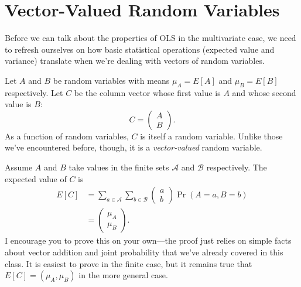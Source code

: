 \documentclass[12pt,oneside,openany]{book}
\begin{document}
\section{Vector-Valued Random
Variables}\label{vector-valued-random-variables}

Before we can talk about the properties of OLS in the multivariate case,
we need to refresh ourselves on how basic statistical operations
(expected value and variance) translate when we're dealing with vectors
of random variables.

Let \(A\) and \(B\) be random variables with means \(\mu_A = E[A]\) and
\(\mu_B = E[B]\) respectively. Let \(C\) be the column vector whose
first value is \(A\) and whose second value is \(B\): \[
C = \begin{pmatrix} A \\ B \end{pmatrix}.
\] As a function of random variables, \(C\) is itself a random variable.
Unlike those we've encountered before, though, it is a
\emph{vector-valued} random variable.

Assume \(A\) and \(B\) take values in the finite sets \(\mathcal{A}\)
and \(\mathcal{B}\) respectively. The expected value of \(C\) is \[
\begin{aligned}
E[C]
&= \sum_{a \in \mathcal{A}} \sum_{b \in \mathcal{B}} \begin{pmatrix} a \\ b \end{pmatrix} \Pr(A = a, B = b) \\
&= \begin{pmatrix} \mu_A \\ \mu_B \end{pmatrix}.
\end{aligned}
\] I encourage you to prove this on your own---the proof just relies on
simple facts about vector addition and joint probability that we've
already covered in this class. It is easiest to prove in the finite
case, but it remains true that \(E[C] = (\mu_A, \mu_B)\) in the more
general case.
\end{document}
